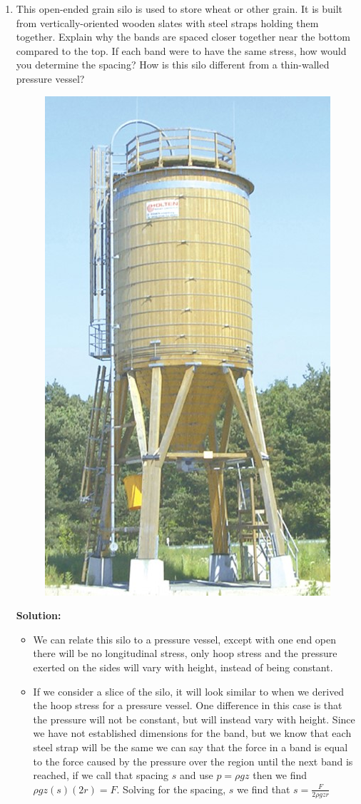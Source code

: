 \documentclass[12pt, oneside]{article}
\begin{document}
\begin{enumerate}
	\item %
		This open-ended grain silo is used to store wheat or other grain.
		It is built from vertically-oriented wooden slates with steel straps holding them together.
		Explain why the bands are spaced closer together near the bottom compared to the top.
		If each band were to have the same stress, how would you determine the spacing?
		How is this silo different from a thin-walled pressure vessel?
		\begin{figure}[H]
			\centering
			\includegraphics[width=0.6\linewidth]{C8-2}
		\end{figure}
			\textbf{Solution:}
			\begin{itemize}
				\item We can relate this silo to a pressure vessel, except with one end open there will be no longitudinal stress, only hoop stress and the pressure exerted on the sides will vary with height, instead of being constant.
				\item If we consider a slice of the silo, it will look similar to when we derived the hoop stress for a pressure vessel.
					One difference in this case is that the pressure will not be constant, but will instead vary with height.
					Since we have not established dimensions for the band, but we know that each steel strap will be the same we can say that the force in a band is equal to the force caused by the pressure over the region until the next band is reached, if we call that spacing $s$ and use $p = \rho g z$ then we find $\rho g z (s) (2r) = F$.
					Solving for the spacing, $s$ we find that $s = \frac{F}{2 \rho g z r}$
			\end{itemize}

\end{enumerate}
\end{document}
